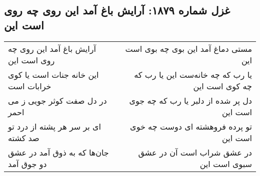 \begin{center}
\section*{غزل شماره ۱۸۷۹: آرایش باغ آمد این روی چه روی است این}
\label{sec:1879}
\begin{longtable}{l p{0.5cm} r}
آرایش باغ آمد این روی چه روی است این
&&
مستی دماغ آمد این بوی چه بوی است این
\\
این خانه جنات است یا کوی خرابات است
&&
یا رب که چه خانه‌ست این یا رب که چه کوی است این
\\
در دل صفت کوثر جویی ز می احمر
&&
دل پر شده از دلبر یا رب که چه جوی است این
\\
ای بر سر هر پشته از درد تو صد کشته
&&
تو پرده فروهشته ای دوست چه خوی است این
\\
جان‌ها که به ذوق آمد در عشق دو جوق آمد
&&
در عشق شراب است آن در عشق سبوی است این
\\
\end{longtable}
\end{center}
